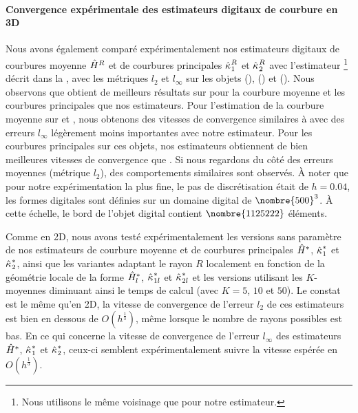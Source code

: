 \paragraph{Convergence expérimentale des estimateurs digitaux de courbure en 3D}
%
Nous avons également comparé expérimentalement nos estimateurs digitaux de
courbures moyenne $\hat{H}^{R}$ et de courbures principales
$\hat{\kappa_{}}_{1}^{R}$ et $\hat{\kappa_{}}_{2}^{R}$ avec l'estimateur \JetFitting
\cite{Cazals2005}\footnote{Nous utilisons le même voisinage que pour notre
estimateur.} décrit dans la , avec les métriques
$l_2$ et $l_\infty$ sur les objets \Sphere
(), \RoundedCube
() et \Goursat
(). Nous observons que \JetFitting
obtient de meilleurs résultats sur \Sphere pour la courbure moyenne et les
courbures principales que nos estimateurs. Pour l'estimation de la courbure
moyenne sur \RoundedCube et \Goursat, nous obtenons des vitesses de convergence
similaires à \JetFitting avec des erreurs $l_\infty$ légèrement moins
importantes avec notre estimateur. Pour les courbures principales sur ces
objets, nos estimateurs obtiennent de bien meilleures vitesses de convergence
que \JetFitting. Si nous regardons du côté des erreurs moyennes (métrique
$l_2$), des comportements similaires sont observés. À noter que pour notre
expérimentation la plus fine, le pas de discrétisation était de $h = 0.04$, les
formes digitales sont définies sur un domaine digital de $\nombre{500}^3$. À
cette échelle, le bord de l'objet digital \RoundedCube contient
$\nombre{1125222}$ éléments.


Comme en 2D, nous avons testé expérimentalement les versions sans paramètre de
nos estimateurs de courbure moyenne et de courbures principales $\hat{H}^{*}$,
$\hat{\kappa_{}}_{1}^{*}$ et $\hat{\kappa_{}}_{2}^{*}$, ainsi que les variantes adaptant le
rayon $R$ localement en fonction de la géométrie locale de la forme
$\hat{H}^{*}_{l}$, $\hat{\kappa_{}}_{1l}^{*}$ et $\hat{\kappa_{}}_{2l}^{*}$ et les versions
utilisant les $K$-moyennes diminuant ainsi le temps de calcul (avec $K = 5$,
$10$ et $50$). Le constat est le même qu'en 2D, la vitesse de convergence de
l'erreur $l_2$ de ces estimateurs est bien en dessous de $O(h^\frac{1}{3})$,
même lorsque le nombre de rayons possibles est bas. En ce qui concerne la vitesse
de convergence de l'erreur $l_\infty$ des estimateurs $\hat{H}^{*}$,
$\hat{\kappa_{}}_{1}^{*}$ et $\hat{\kappa_{}}_{2}^{*}$, ceux-ci semblent expérimentalement
suivre la vitesse espérée en $O(h^\frac{1}{3})$.
%
